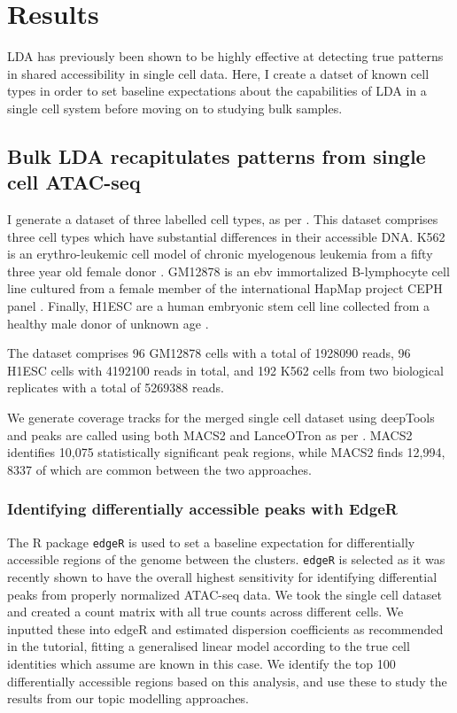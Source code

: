 \section{Results} \label{ch4:results}

LDA has previously been shown to be highly effective at detecting true patterns in shared accessibility in single cell data. Here, I create a datset of known cell types in order to set baseline expectations about the capabilities of LDA in a single cell system before moving on to studying bulk samples.

\subsection{Bulk LDA recapitulates patterns from single cell ATAC-seq}

I generate a dataset of three labelled cell types, as per . This dataset comprises three cell types which have substantial differences in their accessible DNA.  K562 is an erythro-leukemic cell model of chronic myelogenous leukemia from a fifty three year old female donor \cite{Lozzio1975}. GM12878 is an \gls{ebv} immortalized B-lymphocyte cell line cultured from a female member of the international HapMap project CEPH panel \cite{Belmont2005}. Finally, H1ESC are a human embryonic stem cell line collected from a healthy male donor of unknown age \cite{Thomson1998}. 

The dataset comprises 96 GM12878 cells with a total of 1928090 reads, 96 H1ESC cells with 4192100 reads in total, and 192 K562 cells from two biological replicates with a total of 5269388 reads.

We generate coverage tracks for the merged single cell dataset using deepTools and peaks are called using both MACS2 and LanceOTron as per  \cite{Ramirez2014}. MACS2 identifies 10,075 statistically significant peak regions, while MACS2 finds 12,994, 8337 of which are common between the two approaches.  

\subsubsection{Identifying differentially accessible peaks with EdgeR} \label{ch4:edgeR}

The R package {\tt edgeR} is used to set a baseline expectation for differentially accessible regions of the genome between the clusters. {\tt edgeR} is selected as it was recently shown to have the overall highest sensitivity for identifying differential peaks from properly normalized ATAC-seq data. We took the single cell dataset and created a count matrix with all true counts across different cells. We inputted these into edgeR and estimated dispersion coefficients as recommended in the tutorial, fitting a generalised linear model according to the true cell identities which assume are known in this case. We identify the top 100 differentially accessible regions based on this analysis, and use these to study the results from our topic modelling approaches.

